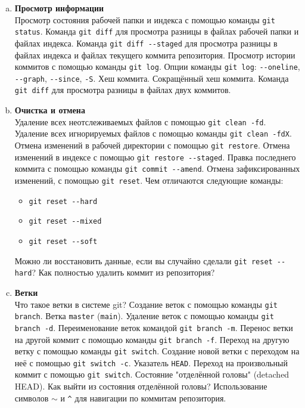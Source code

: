 \documentclass{article}
\begin{document}
\begin{enumerate}
\begin{enumerate}[a.]
\item \textbf{Просмотр информации}\\
Просмотр состояния рабочей папки и индекса с помощью команды \texttt{git status}.
Команда \texttt{git diff} для просмотра разницы в файлах рабочей папки и файлах индекса.
Команда \texttt{git diff -{}-staged} для просмотра разницы в файлах индекса и файлах текущего коммита репозитория.
Просмотр истории коммитов с помощью команды \texttt{git log}. Опции команды \texttt{git log}: \texttt{-{}-oneline}, \texttt{-{}-graph}, \texttt{-{}-since}, \texttt{-S}. Хеш коммита. Сокращённый хеш коммита. Команда \texttt{git diff} для просмотра разницы в файлах двух коммитов.

\item \textbf{Очистка и отмена}\\
Удаление всех неотслеживаемых файлов с помощью \texttt{git clean -fd}.
Удаление всех игнорируемых файлов с помощью команды \texttt{git clean -fdX}.
Отмена изменений в рабочей директории с помощью \texttt{git restore}. 
Отмена изменений в индексе с помощью \texttt{git restore -{}-staged}.
Правка последнего коммита с помощью команды \texttt{git commit -{}-amend}. 
Отмена зафиксированных изменений, с помощью \texttt{git reset}.
Чем отличаются следующие команды:
\begin{itemize}
\item \texttt{git reset -{}-hard}
\item \texttt{git reset -{}-mixed}
\item \texttt{git reset -{}-soft}
\end{itemize}
Можно ли восстановить данные, если вы случайно сделали \texttt{git reset -{}-hard}? 
Как полностью удалить коммит из репозитория?

\item \textbf{Ветки}\\
Что такое ветки в системе git? Создание веток с помощью команды \texttt{git branch}. Ветка \texttt{master} (\texttt{main}). Удаление веток с помощью команды \texttt{git branch -d}. Переименование веток командой \texttt{git branch -m}. Перенос ветки на другой коммит с помощью команды \texttt{git branch -f}. Переход на другую ветку с помощью команды \texttt{git switch}. Создание новой ветки с переходом на неё с помощью \texttt{git switch -c}. Указатель \texttt{HEAD}. Переход на произвольный коммит с помощью \texttt{git switch}. Состояние "отделённой головы" (detached HEAD). Как выйти из состояния отделённой головы?
Использование символов \texttt{$\sim$} и \texttt{\textasciicircum} для навигации по коммитам репозитория.


\end{enumerate}
\end{enumerate}
\end{document}
